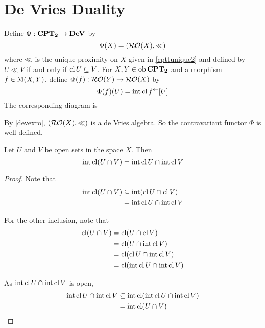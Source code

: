 \section{De Vries Duality}
\label{devriesduality}


\begin{definition}
	Define \( \Phi: \CPTT \to \DeV \) by
	\[ \Phi(X) = (\RO(X), \sll) \]
	where \( \sll \) is the unique proximity on \( X \) given in \ref{cpttunique2} and defined by \( U \ll V \) if and only if \( \cl{U} \subseteq V \).  For \( X,Y \in \obj{\CPTT} \) and a morphism \( f \in \mor(X,Y) \), define \( \Phi(f): \RO(Y) \to \RO(X) \) by
	\[ \Phi(f)(U) = \int\cl{f^\leftarrow[U]} \]
	The corresponding diagram is
\end{definition}

\begin{remark}
	By \ref{devexro}, \( (\RO(X), \ll) \) is a de Vries algebra.  So the contravariant functor \( \Phi \) is well-defined.
\end{remark}

\begin{proposition}
	\label{rocap}
	Let \( U \) and \( V \) be open sets in the space \( X \).  Then
	\[ \int\cl(U \cap V) = \int\cl{U} \cap \int\cl{V} \]
\end{proposition}
\begin{proof}
	Note that
	\begin{align*}
		\int\cl(U \cap V) &\subseteq \int(\cl{U} \cap \cl{V}) \\
		&= \int\cl{U} \cap \int\cl{V}
	\end{align*}

	For the other inclusion, note that
	\begin{align*}
		\cl(U \cap V) &= \cl(U \cap \cl{V}) \\
		&= \cl(U \cap \int\cl{V}) \\
		&= \cl(\cl{U} \cap \int\cl{V}) \\
		&= \cl(\int\cl{U} \cap \int\cl{V})
	\end{align*}
	
	As \( \int\cl{U} \cap \int\cl{V} \) is open,
	\begin{align*}
		\int\cl{U} \cap \int{\cl{V}} &\subseteq \int\cl(\int\cl{U} \cap \int\cl{V}) \\
		&= \int\cl(U \cap V)
	\end{align*}	
\end{proof}

